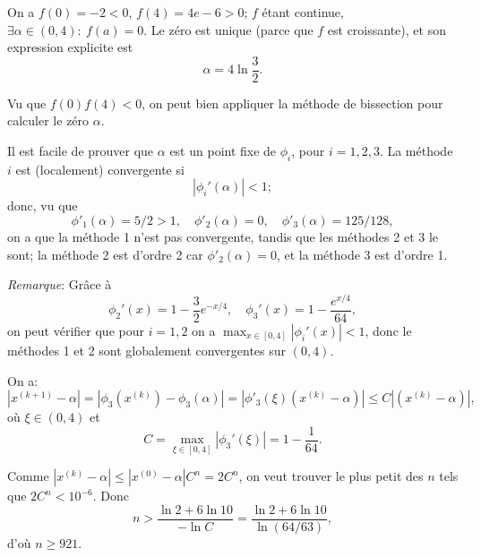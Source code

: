 \documentclass[11pt]{article}
\begin{document}
\begin{Answer}[ref={ex:2}]
\Question
On a $f(0) = -2 < 0$, $f(4) = 4 e - 6 > 0$; $f$ \'etant continue,
$\exists \alpha \in (0,4): \ f(a) = 0$.
Le z\'ero est unique (parce que $f$ est croissante), et son expression explicite est
$$
\alpha = 4 \ln \frac{3}{2}.
$$

\Question
Vu que $f(0)f(4) <0$, on peut bien appliquer la m\'ethode de bissection pour calculer le
z\'ero $\alpha$.

\Question
Il est facile de prouver que $\alpha$ est un point fixe de $\phi_i$, pour $i = 1,2,3$.
La m\'ethode $i$ est (localement) convergente si
$$
| \phi_i'(\alpha) | < 1;
$$
donc, vu que
$$
\phi'_1(\alpha) = 5/2 > 1, \quad
\phi'_2(\alpha) = 0, \quad
\phi'_3(\alpha) = 125/128,
$$
on a que la m\'ethode 1 n'est pas convergente, tandis que les m\'ethodes 2 et 3
le sont; la m\'ethode 2 est d'ordre 2 car $\phi'_2(\alpha) = 0$, et la m\'ethode 3 est d'ordre 1.

{\it Remarque}: Gr\^ace \`a
$$
\phi_2'(x) = 1 - \frac{3}{2} e^{-x/4}, \quad \phi_3'(x) = 1 - \frac{e^{x/4}}{64},
$$
on peut v\'erifier que pour $i = 1,2$ on a $\max _{x\in [0,4]} | \phi_i'(x) | < 1$,
donc le m\'ethodes 1 et 2 sont globalement convergentes sur $(0,4)$.

\Question
On a:
$$
| x^{(k+1)} - \alpha | = | \phi_3(x^{(k)}) - \phi_3(\alpha) |
 = | \phi'_3(\xi) (x^{(k)} - \alpha) | \leq C |(x^{(k)} - \alpha) |,
$$
o\`u $\xi \in (0,4)$ et
$$
C = \max_{\xi \in[0,4]} | \phi_3'(\xi)| = 1 - \frac{1}{64}.
$$

\Question
Comme $| x^{(k)} - \alpha | \leq | x^{(0)} - \alpha | C^n = 2 C^n$,
on veut trouver le plus petit des $n$ tels que $2 C^n < 10^{-6}$.
Donc
$$
n > \frac{\ln 2 + 6 \ln 10}{- \ln C} = \frac{\ln 2 + 6 \ln 10}{\ln(64/63)},
$$
d'o\`u $n \geq 921$.

\end{Answer}
\end{document}
